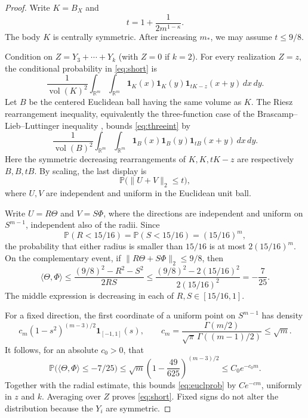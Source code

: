 \documentclass[11pt]{article}
\newcommand{\vol}{\operatorname{vol}}
\begin{document}
\begin{proof}
Write $K=B_X$ and
\[
 t=1+\frac{1}{2m^{1-\kappa}}.
\]
The body $K$ is centrally symmetric. After increasing $m_\ast$, we may
assume $t\leq9/8$.

Condition on $Z=Y_3+\cdots+Y_k$ (with $Z=0$ if $k=2$). For every realization
$Z=z$, the conditional probability in \eqref{eq:short} is
\begin{equation}\label{eq:threeint}
 \frac{1}{\vol(K)^2}
 \int_{\mathbb R^m}\!\int_{\mathbb R^m}
 \mathbf 1_K(x)\mathbf 1_K(y)
 \mathbf 1_{tK-z}(x+y)\,dx\,dy.
\end{equation}
Let $B$ be the centered Euclidean ball having the same volume as $K$. The
Riesz rearrangement inequality, equivalently the three-function case of the
Brascamp--Lieb--Luttinger inequality \cite{BLL}, bounds
\eqref{eq:threeint} by
\[
 \frac{1}{\vol(B)^2}
 \int_{\mathbb R^m}\!\int_{\mathbb R^m}
 \mathbf 1_B(x)\mathbf 1_B(y)\mathbf 1_{tB}(x+y)\,dx\,dy.
\]
Here the symmetric decreasing rearrangements of $K,K,tK-z$ are respectively
$B,B,tB$. By scaling, the last display is
\begin{equation}\label{eq:euclprob}
 \mathbb P\bigl(\|U+V\|_2\leq t\bigr),
\end{equation}
where $U,V$ are independent and uniform in the Euclidean unit ball.

Write $U=R\Theta$ and $V=S\Phi$, where the directions are independent and
uniform on $S^{m-1}$, independent also of the radii. Since
\[
 \mathbb P(R<15/16)=\mathbb P(S<15/16)=(15/16)^m,
\]
the probability that either radius is smaller than $15/16$ is at most
$2(15/16)^m$. On the complementary event, if
$\|R\Theta+S\Phi\|_2\leq9/8$, then
\[
 \langle\Theta,\Phi\rangle
 \leq
 \frac{(9/8)^2-R^2-S^2}{2RS}
 \leq
 \frac{(9/8)^2-2(15/16)^2}{2(15/16)^2}
 =-\frac7{25}.
\]
The middle expression is decreasing in each of $R,S\in[15/16,1]$.

For a fixed direction, the first coordinate of a uniform point on
$S^{m-1}$ has density
\[
 c_m(1-s^2)^{(m-3)/2}\mathbf1_{[-1,1]}(s),
 \qquad
 c_m=\frac{\Gamma(m/2)}{\sqrt\pi\,\Gamma((m-1)/2)}\leq\sqrt m.
\]
It follows, for an absolute $c_0>0$, that
\[
 \mathbb P\bigl(\langle\Theta,\Phi\rangle\leq-7/25\bigr)
 \leq \sqrt m\left(1-\frac{49}{625}\right)^{(m-3)/2}
 \leq C_0e^{-c_0m}.
\]
Together with the radial estimate, this bounds \eqref{eq:euclprob} by
$Ce^{-cm}$, uniformly in $z$ and $k$. Averaging over $Z$ proves
\eqref{eq:short}. Fixed signs do not alter the distribution because the
$Y_i$ are symmetric.
\end{proof}
\end{document}

